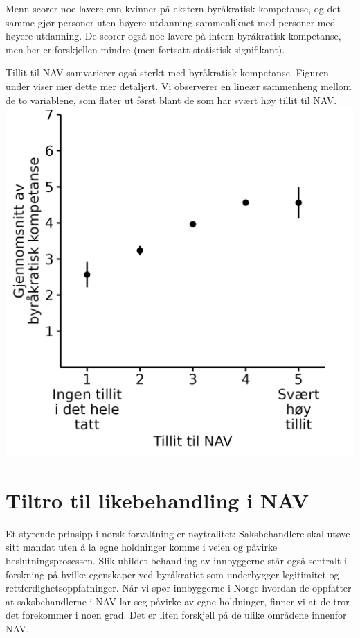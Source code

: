 \documentclass[
]{book}
\begin{document}
Menn scorer noe lavere enn kvinner på ekstern byråkratisk kompetanse, og det samme gjør personer uten høyere utdanning sammenliknet med personer med høyere utdanning.
De scorer også noe lavere på intern byråkratisk kompetanse, men her er forskjellen mindre (men fortsatt statistisk signifikant).

Tillit til NAV samvarierer også sterkt med byråkratisk kompetanse.
Figuren under viser mer dette mer detaljert.
Vi observerer en lineær sammenheng mellom de to variablene, som flater ut først blant de som har svært høy tillit til NAV.
\includegraphics{figs/png/fig_be_by_navtrust.png}

\hypertarget{tiltro-til-likebehandling-i-nav}{%
\section{Tiltro til likebehandling i NAV}\label{tiltro-til-likebehandling-i-nav}}

Et styrende prinsipp i norsk forvaltning er nøytralitet:
Saksbehandlere skal utøve sitt mandat uten å la egne holdninger komme i veien og påvirke beslutningsprosessen.
Slik uhildet behandling av innbyggerne står også sentralt i forskning på hvilke egenskaper ved byråkratiet som underbygger legitimitet og rettferdighetsoppfatninger.
Når vi spør innbyggerne i Norge hvordan de oppfatter at saksbehandlerne i NAV lar seg påvirke av egne holdninger, finner vi at de tror det forekommer i noen grad.
Det er liten forskjell på de ulike områdene innenfor NAV.
\end{document}
